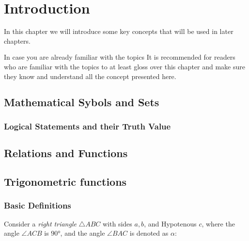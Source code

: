 \chapter{Introduction}
In this chapter we will introduce some key concepts that will be used in later chapters.

\begin{note}{In case you are already familiar with the topics}{}
	It is recommended for readers who are familiar with the topics to at least gloss over this chapter and make sure they know and understand all the concept presented here.
\end{note}

\section{Mathematical Sybols and Sets}
\subsection{Logical Statements and their Truth Value}
\Blindtext[1]

\section{Relations and Functions}
\section{Trigonometric functions}
\subsection{Basic Definitions}
Consider a \emph{right triangle} $\triangle ABC$ with sides $a,b$, and Hypotenous $c$, where the angle $\angle ACB$ is $\ang{90}$, and the angle $\angle BAC$ is denoted as $\alpha$:

\centering
{}
\flushleft

